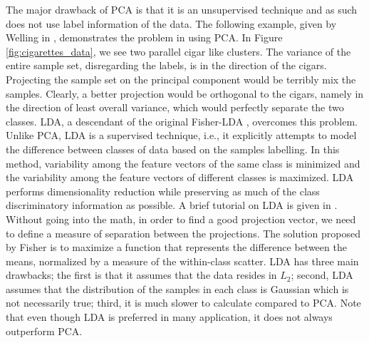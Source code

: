 \iftoggle{edit-mode}{\hspace{0pt}\marginpar{LDA}}{}
The major drawback of PCA is that it is an unsupervised technique and as such does not use label information of the data. 
The following example, given by Welling in \cite{welling2005fisher}, demonstrates the problem in using PCA. 
In Figure \ref{fig:cigarettes_data}, we see two parallel cigar like clusters. 
The variance of the entire sample set, disregarding the labels, is in the direction of the cigars. 
Projecting the sample set on the principal component would be terribly mix the samples. 
Clearly, a better projection would be orthogonal to the cigars, namely in the direction of least overall variance, which would perfectly separate the two classes.
LDA, a descendant of the original Fisher-LDA \cite{fisher1936use}, overcomes this problem. 
Unlike PCA, LDA is a supervised technique, i.e., it explicitly attempts to model the difference between classes of data based on the samples labelling. 
In this method, variability among the feature vectors of the same class is minimized and the variability among the feature vectors of different classes is maximized. 
LDA performs dimensionality reduction while preserving as much of the class discriminatory information as possible. 
A brief tutorial on LDA is given in \cite{balakrishnama1998linear}. 
Without going into the math, in order to find a good projection vector, we need to define a measure of separation between the projections. 
The solution proposed by Fisher is to maximize a function that represents the difference between the means, normalized by a measure of the within-class scatter. 
LDA has three main drawbacks; the first is that it assumes that the data resides in $L_2$; second, LDA assumes that the distribution of the samples in each class is Gaussian which is not necessarily true; third, it is much slower to calculate compared to PCA.
Note that even though LDA is preferred in many application, it does not always outperform PCA.  


